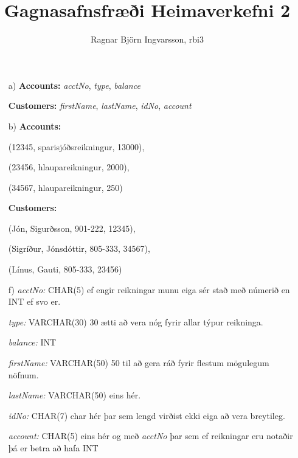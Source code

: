 \documentclass{article}
\title{Gagnasafnsfræði Heimaverkefni 2}
\author{Ragnar Björn Ingvarsson, rbi3}
\begin{document}
	
	\maketitle
	
	\section{}
	\begin{itemize}
		\item[a)] \textbf{Accounts:} \textit{acctNo},
			\textit{type},
			\textit{balance}

		\textbf{Customers:} \textit{firstName},
			\textit{lastName},
			\textit{idNo},
			\textit{account}
		\item[b)] \textbf{Accounts:}

			(12345, sparisjóðsreikningur, 13000), 

			(23456, hlaupareikningur, 2000), 

			(34567, hlaupareikningur, 250)

			\textbf{Customers:}

			(Jón, Sigurðsson, 901-222, 12345),

			(Sigríður, Jónsdóttir, 805-333, 34567),

			(Línus, Gauti, 805-333, 23456)

		\item[f)] \textit{acctNo:} CHAR(5) ef engir reikningar
			munu eiga sér stað með númerið en INT ef svo er.

		\textit{type:} VARCHAR(30) 30 ætti að vera nóg fyrir 
		allar týpur reikninga.

		\textit{balance:} INT

		\textit{firstName:} VARCHAR(50) 50 til að gera ráð fyrir 
		flestum mögulegum nöfnum.

		\textit{lastName:} VARCHAR(50) eins hér.

		\textit{idNo:} CHAR(7) char hér þar sem lengd virðist ekki 
		eiga að vera breytileg.

		\textit{account:} CHAR(5) eins hér og með \textit{acctNo} 
		þar sem ef reikningar eru notaðir þá er betra að hafa INT
	\end{itemize}

	\newpage
	\section{}
\end{document}
